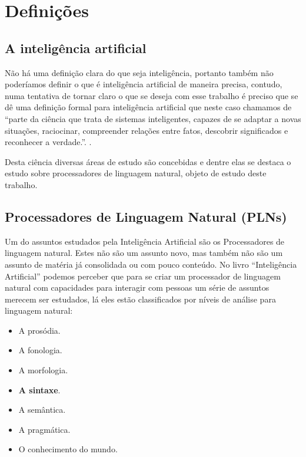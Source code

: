 \documentclass[12pt,a4paper,oneside,english,brazilian,brazil]{abntex2}
\begin{document}





\chapter{Definições}

\section{A inteligência artificial}

\par Não há uma definição clara do que seja inteligência, portanto também não poderíamos definir o que é inteligência artificial de maneira precisa, contudo, numa tentativa de tornar claro o que se deseja com esse trabalho é preciso que se dê uma definição  formal para inteligência artificial que neste caso chamamos de ``parte da ciência que trata de sistemas inteligentes, capazes de se adaptar a novas situações, raciocinar, compreender relações entre fatos, descobrir significados e reconhecer a verdade.''. \cite{michaelis}. \

\par Desta ciência diversas áreas de estudo são concebidas e dentre elas se destaca o estudo sobre processadores de linguagem natural, objeto de estudo deste trabalho. \


\section{Processadores de Linguagem Natural (PLNs)}

Um do assuntos estudados pela Inteligência Artificial são os Processadores de linguagem natural. Estes não são um assunto novo, mas também não são um assunto de matéria já consolidada ou com pouco conteúdo. No livro ``Inteligência Artificial'' \cite{luger} podemos perceber que para se criar um processador de linguagem natural com capacidades para interagir com pessoas um série de assuntos merecem ser estudados, lá eles estão classificados por níveis de análise para linguagem natural:

\begin{itemize}
\item A prosódia.
\item A fonologia.
\item A morfologia.
\item \textbf{A sintaxe}.
\item A semântica.
\item A pragmática.
\item O conhecimento do mundo.
\end{itemize}
\end{document}
